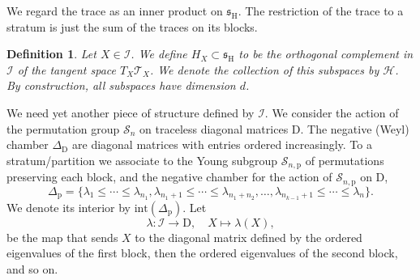 \documentclass[reqno]{amsart}
\newcommand{\p}{\mathrm{p}}
\newcommand{\D}{\mathrm{D}}
\renewcommand{\ss}{\mathfrak{s}}
\newcommand{\cI}{\mathcal{I}}
\newcommand{\cS}{\mathcal{S}}
\newcommand{\cT}{\mathcal{T}}
\renewcommand{\H}{\mathrm{H}}
\newtheorem{definition}[theorem]{Definition}
\begin{document}
We regard the trace as an inner product on $\ss_\H$.
The restriction of the trace to a stratum is just the sum of the traces on its blocks.

\begin{definition}\label{def:Ehreshmann} Let $X\in \cI$. We define $H_X\subset \ss_\H$ to be the orthogonal complement in $\cI$ of the tangent space $T_X\cT_X$.
We denote the collection of this subspaces by $\mathcal{H}$. By construction, all subspaces have dimension $d$.
\end{definition}

We need yet another piece of structure defined by $\cI$. We consider the action of the permutation group  $\cS_n$ on traceless diagonal matrices $\D$. The negative (Weyl) chamber $\Delta_\D$ are  diagonal matrices with entries ordered increasingly. To a stratum/partition  we associate to the Young subgroup $\cS_{n,\p}$ of permutations preserving each block, and the negative chamber for the action of $\cS_{n,\p}$ on  $\D$,
\[\Delta_\p=\{ \lambda_1\leq \cdots\leq \lambda_{n_1},\lambda_{n_1+1}\leq \cdots \leq\lambda_{n_1+n_2},\dots, \lambda_{n_{k-1}+1}\leq\cdots \leq\lambda_n\}.\] We denote its interior by $\mathrm{int}(\Delta_{\p})$. Let
\[\lambda:\cI\to \mathrm{D},\quad X\mapsto \lambda(X),\]
 be the map that  sends $X$ to the diagonal matrix defined by the ordered eigenvalues of the first block, then the ordered eigenvalues of the second block, and so on.
\end{document}

